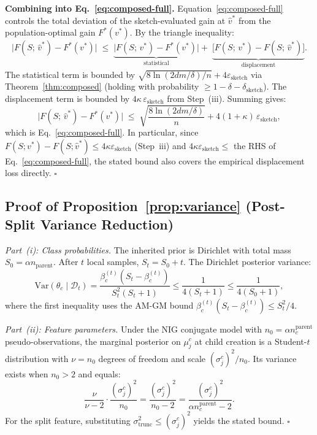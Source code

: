 \documentclass{article}
\begin{document}
\textbf{Combining into Eq.~\eqref{eq:composed-full}.}
Equation~\eqref{eq:composed-full} controls the total deviation of the
sketch-evaluated gain at $\hat{v}^*$ from the population-optimal gain
$F^*(v^*)$.
By the triangle inequality:
\[
  \bigl|F(S;\,\hat{v}^*) - F^*(v^*)\bigr|
  \;\leq\;
  \underbrace{\bigl|F(S;\,v^*) - F^*(v^*)\bigr|}_{\text{statistical}}
  +\;
  \underbrace{\bigl[F(S;\,v^*) - F(S;\,\hat{v}^*)\bigr]}_{\text{displacement}}.
\]
The statistical term is bounded by
$\sqrt{8\ln(2dm/\delta)/n} + 4\varepsilon_{\mathrm{sketch}}$
via Theorem~\ref{thm:composed} (holding with probability
$\geq 1-\delta-\delta_{\mathrm{sketch}}$).
The displacement term is bounded by
$4\kappa\,\varepsilon_{\mathrm{sketch}}$ from Step~(iii).
Summing gives:
\[
  \bigl|F(S;\,\hat{v}^*) - F^*(v^*)\bigr|
  \;\leq\;
  \sqrt{\frac{8\ln(2dm/\delta)}{n}}
  + 4(1+\kappa)\,\varepsilon_{\mathrm{sketch}},
\]
which is Eq.~\eqref{eq:composed-full}.
In particular, since $F(S;v^*)-F(S;\hat{v}^*)\leq 4\kappa\varepsilon_{\mathrm{sketch}}$
(Step~iii) and $4\kappa\varepsilon_{\mathrm{sketch}} \leq$ the RHS of
Eq.~\eqref{eq:composed-full}, the stated bound also covers the
empirical displacement loss directly.
\hfill$\square$

\subsection{Proof of Proposition~\ref{prop:variance}
           (Post-Split Variance Reduction)}
\label{app:proof-variance}

\textit{Part~(i): Class probabilities.}
The inherited prior is Dirichlet with total mass
$S_0 = \alpha n_{\mathrm{parent}}$.
After $t$ local samples, $S_t = S_0 + t$.
The Dirichlet posterior variance:
\[
  \mathrm{Var}(\theta_c \mid \mathcal{D}_t)
  = \frac{\beta_c^{(t)}(S_t - \beta_c^{(t)})}{S_t^2(S_t+1)}
  \leq \frac{1}{4(S_t+1)}
  \leq \frac{1}{4(S_0+1)},
\]
where the first inequality uses the AM-GM bound
$\beta_c^{(t)}(S_t-\beta_c^{(t)}) \leq S_t^2/4$.

\textit{Part~(ii): Feature parameters.}
Under the NIG conjugate model with
$n_0 = \alpha n_c^{\mathrm{parent}}$ pseudo-observations,
the marginal posterior on $\mu_j^c$ at child creation is a
Student-$t$ distribution with $\nu = n_0$ degrees of freedom and
scale $(\sigma_j^c)^2/n_0$.
Its variance exists when $n_0 > 2$ and equals:
\[
  \frac{\nu}{\nu-2}\cdot\frac{(\sigma_j^c)^2}{n_0}
  = \frac{(\sigma_j^c)^2}{n_0-2}
  = \frac{(\sigma_j^c)^2}{\alpha n_c^{\mathrm{parent}} - 2}.
\]
For the split feature, substituting
$\sigma_{\mathrm{trunc}}^2 \leq (\sigma_j^c)^2$
yields the stated bound.
\hfill$\square$
\end{document}
